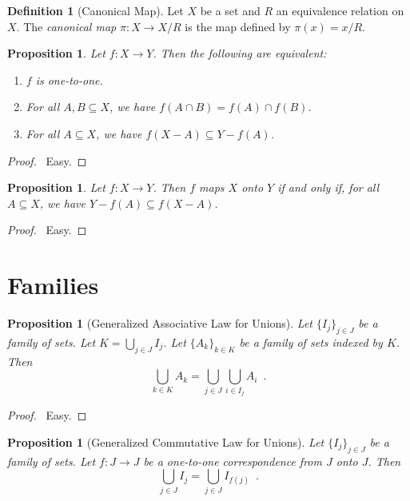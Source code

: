 \documentclass{report}
\let\qed\relax
\newtheorem{prop}[ax]{Proposition}
\theoremstyle{definition}
\newtheorem{df}[ax]{Definition}
\begin{document}
\begin{df}[Canonical Map]
Let $X$ be a set and $R$ an equivalence relation on $X$. The \emph{canonical map} $\pi : X \rightarrow X / R$ is the map defined by $\pi(x) = x / R$.
\end{df}

\begin{prop}
Let $f : X \rightarrow Y$. Then the following are equivalent:
\begin{enumerate}
\item $f$ is one-to-one.
\item For all $A,B \subseteq X$, we have $f(A \cap B) = f(A) \cap f(B)$.
\item For all $A \subseteq X$, we have $f(X-A) \subseteq Y - f(A)$.
\end{enumerate}
\end{prop}

\begin{proof}
\pf\ Easy. \qed
\end{proof}

\begin{prop}
Let $f : X \rightarrow Y$. Then $f$ maps $X$ onto $Y$ if and only if, for all $A \subseteq X$, we have $Y - f(A) \subseteq f(X-A)$.
\end{prop}

\begin{proof}
\pf\ Easy. \qed
\end{proof}

\section{Families}

\begin{prop}[Generalized Associative Law for Unions]
Let $\{I_j\}_{j \in J}$ be a family of sets. Let $K = \bigcup_{j \in J} I_j$. Let $\{A_k\}_{k \in K}$ be a family of sets indexed by $K$. Then
\[ \bigcup_{k \in K} A_k = \bigcup_{j \in J} \bigcup_{i \in I_j} A_i \enspace . \]
\end{prop}

\begin{proof}
\pf\ Easy. \qed
\end{proof}

\begin{prop}[Generalized Commutative Law for Unions]
Let $\{I_j\}_{j \in J}$ be a family of sets. Let $f : J \rightarrow J$ be a one-to-one correspondence from $J$ onto $J$. Then
\[ \bigcup_{j \in J} I_j = \bigcup_{j \in J} I_{f(j)} \enspace . \]
\end{prop}
\end{document}
